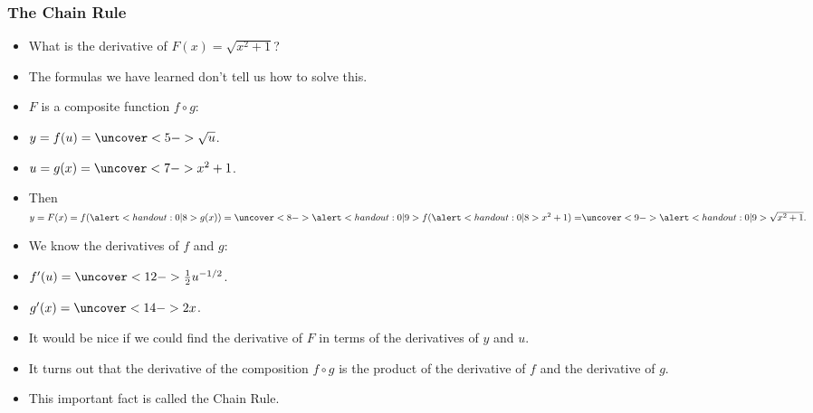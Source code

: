 \begin{frame}
\frametitle{The Chain Rule}
\begin{itemize}
\item  What is the derivative of $F(x) = \sqrt{x^2 + 1}$?
\item<2->  The formulas we have learned don't tell us how to solve this.
\item<3->  $F$ is a composite function $f\circ g$:
\item<3-| alert@4-5,9,11-12>  $y = f(u) = \uncover<5->{\sqrt{u}}$.
\item<3-| alert@6-8,13-14>  $u = g(x) = \uncover<7->{x^2+1}$.
\item<3->  Then $y = F(x) = f(\alert<handout:0| 8>{g(x)}) = \uncover<8->{\alert<handout:0| 9>{f(\alert<handout:0| 8>{x^2+1}) =}}  \uncover<9->{\alert<handout:0| 9>{\sqrt{x^2+1}}.}$
\item<10->  We know the derivatives of $f$ and $g$:
\item<10-| alert@11-12>  $f'(u) = \uncover<12->{\frac{1}{2}u^{-1/2}}$.
\item<10-| alert@13-14>  $g'(x) = \uncover<14->{2x}$.
\item<15->  It would be nice if we could find the derivative of $F$ in terms of the derivatives of $y$ and $u$.
\item<16->  It turns out that the derivative of the composition $f\circ g$ is the product of the derivative of $f$ and the derivative of $g$.
\item<17->  This important fact is called the Chain Rule.
\end{itemize}
\end{frame}
